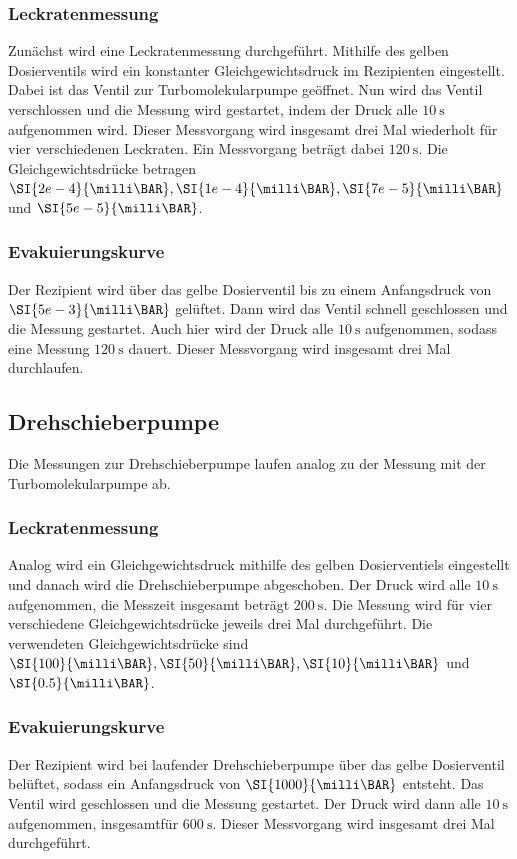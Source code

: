             \subsubsection{Leckratenmessung}
                Zunächst wird eine Leckratenmessung durchgeführt.
                Mithilfe des gelben Dosierventils wird ein konstanter Gleichgewichtsdruck im Rezipienten eingestellt.
                Dabei ist das Ventil zur Turbomolekularpumpe geöffnet.
                Nun wird das Ventil verschlossen und die Messung wird gestartet, indem der Druck alle $\SI{10}{\second}$ aufgenommen wird.
                Dieser Messvorgang wird insgesamt drei Mal wiederholt für vier verschiedenen Leckraten.
                Ein Messvorgang beträgt dabei $\SI{120}{\second}$.
                Die Gleichgewichtsdrücke betragen $\SI{2e-4}{\milli\BAR}, \SI{1e-4}{\milli\BAR}, \SI{7e-5}{\milli\BAR}$ und $\SI{5e-5}{\milli\BAR}$.

            \subsubsection{Evakuierungskurve}
                Der Rezipient wird über das gelbe Dosierventil bis zu einem Anfangsdruck von $\SI{5e-3}{\milli\BAR}$ gelüftet.
                Dann wird das Ventil schnell geschlossen und die Messung gestartet.
                Auch hier wird der Druck alle $\SI{10}{\second}$ aufgenommen, sodass eine Messung $\SI{120}{\second}$ dauert.
                Dieser Messvorgang wird insgesamt drei Mal durchlaufen.

        \subsection{Drehschieberpumpe}
            Die Messungen zur Drehschieberpumpe laufen analog zu der Messung mit der Turbomolekularpumpe ab.
            \subsubsection{Leckratenmessung}
                Analog wird ein Gleichgewichtsdruck mithilfe des gelben Dosierventiels eingestellt und danach wird die Drehschieberpumpe abgeschoben.
                Der Druck wird alle $\SI{10}{\second}$ aufgenommen, die Messzeit insgesamt beträgt $\SI{200}{\second}$.
                Die Messung wird für vier verschiedene Gleichgewichtsdrücke jeweils drei Mal durchgeführt.
                Die verwendeten Gleichgewichtsdrücke sind $\SI{100}{\milli\BAR}, \SI{50}{\milli\BAR}, \SI{10}{\milli\BAR}$ und $\SI{0.5}{\milli\BAR}$.
            \subsubsection{Evakuierungskurve}
                Der Rezipient wird bei laufender Drehschieberpumpe über das gelbe Dosierventil belüftet, sodass ein Anfangsdruck von $\SI{1000}{\milli\BAR}$ entsteht.
                Das Ventil wird geschlossen und die Messung gestartet.
                Der Druck wird dann alle $\SI{10}{\second}$ aufgenommen, insgesamtfür $\SI{600}{\second}$.
                Dieser Messvorgang wird insgesamt drei Mal durchgeführt.